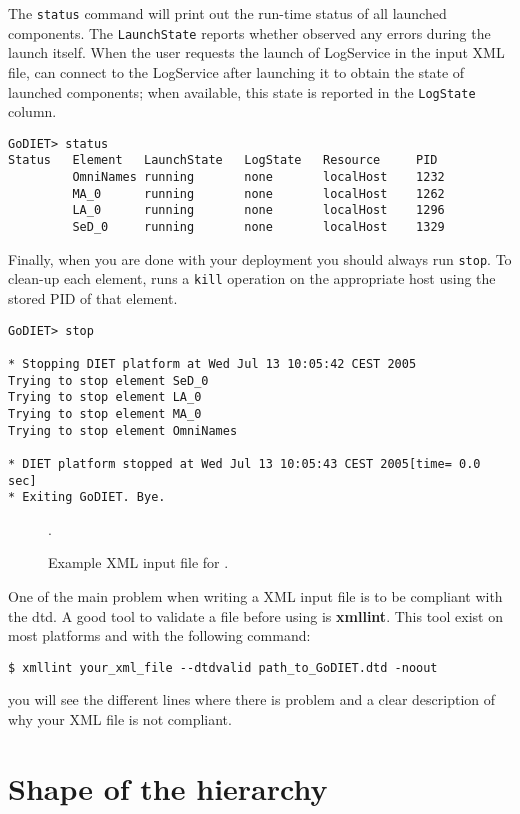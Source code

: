 The \texttt{status} command will print out the run-time status of all launched
components. The \texttt{LaunchState} reports whether \godiet observed any
errors during the launch itself. When the user requests the launch of
LogService in the input XML file, \godiet can connect to the LogService  after
launching it to obtain the state of launched components; when available, this
state is reported in the \texttt{LogState} column.

\begin{verbatim}
GoDIET> status
Status   Element   LaunchState   LogState   Resource     PID
         OmniNames running       none       localHost    1232
         MA_0      running       none       localHost    1262
         LA_0      running       none       localHost    1296
         SeD_0     running       none       localHost    1329
\end{verbatim}

Finally, when you are done with your \diet deployment you should always run
\texttt{stop}. To clean-up each element, \godiet runs a \texttt{kill} operation
on the appropriate host using the stored PID of that element.

\begin{verbatim}
GoDIET> stop

* Stopping DIET platform at Wed Jul 13 10:05:42 CEST 2005
Trying to stop element SeD_0
Trying to stop element LA_0
Trying to stop element MA_0
Trying to stop element OmniNames

* DIET platform stopped at Wed Jul 13 10:05:43 CEST 2005[time= 0.0 sec]
* Exiting GoDIET. Bye.
\end{verbatim}

\begin{figure}[p]
.
\caption{Example XML input file for \godiet.\label{fig:godietXml}}
\end{figure}

One of the main problem when writing a \godiet XML input file is to be compliant
with the dtd. A good tool to validate a \godiet file before using \godiet is
\textbf{xmllint}. This tool exist on most platforms and with the following
command:
\begin{verbatim}
$ xmllint your_xml_file --dtdvalid path_to_GoDIET.dtd -noout
\end{verbatim}
you will see the different lines where there is problem and a clear description
of why your XML file is not compliant.

\clearpage

\section{Shape of the hierarchy}

